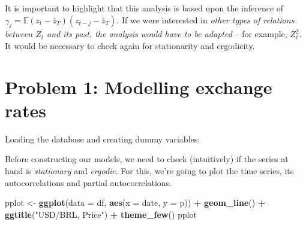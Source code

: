 \documentclass[11pt, a4paper]{report}
\newenvironment{Shaded}{\begin{snugshade}}{\end{snugshade}}
\newcommand{\DataTypeTok}[1]{\textcolor[rgb]{0.13,0.29,0.53}{#1}}
\newcommand{\DecValTok}[1]{\textcolor[rgb]{0.00,0.00,0.81}{#1}}
\newcommand{\KeywordTok}[1]{\textcolor[rgb]{0.13,0.29,0.53}{\textbf{#1}}}
\newcommand{\NormalTok}[1]{#1}
\newcommand{\OperatorTok}[1]{\textcolor[rgb]{0.81,0.36,0.00}{\textbf{#1}}}
\newcommand{\StringTok}[1]{\textcolor[rgb]{0.31,0.60,0.02}{#1}}
\theoremstyle{plain}
\theoremstyle{plain}
\theoremstyle{remark}
\begin{document}
It is important to highlight that this analysis is based upon the inference of $\gamma_{j}=\mathbb{E}\left(z_{t}-\bar{z}_{T}\right)\left(z_{t-j}-\bar{z}_{T}\right).$ If we were interested in \textit{other types of relations between $Z_t$ and its past, the analysis would have to be adapted} -- for example, $Z_t^2$. It would be necessary to check again for stationarity and ergodicity.


\chapter{Problem 1: Modelling exchange rates}

Loading the database and creating dummy variables:

\begin{Shaded}
\end{Shaded}

Before constructing our models, we need to check (intuitively) if the
series at hand is \emph{stationary} and \emph{ergodic}. For this, we're
going to plot the time series, its autocorrelations and partial
autocorrelations.

\begin{Shaded}
\begin{Highlighting}[]
\NormalTok{pplot <-}\StringTok{ }\KeywordTok{ggplot}\NormalTok{(}\DataTypeTok{data =}\NormalTok{ df, }\KeywordTok{aes}\NormalTok{(}\DataTypeTok{x =}\NormalTok{ date, }\DataTypeTok{y =}\NormalTok{ p)) }\OperatorTok{+}\StringTok{ }\KeywordTok{geom_line}\NormalTok{() }\OperatorTok{+}\StringTok{ }
\StringTok{    }\KeywordTok{ggtitle}\NormalTok{(}\StringTok{"USD/BRL, Price"}\NormalTok{) }\OperatorTok{+}\StringTok{ }\KeywordTok{theme_few}\NormalTok{()}
\NormalTok{pplot}
\end{Highlighting}
\end{Shaded}
\end{document}
